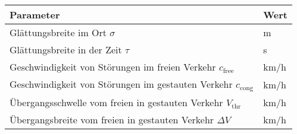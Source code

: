 \documentclass[portrait, a0, final]{a0poster}
\begin{document}
\sf
\normalsize
\begin{minipage}{35cm}
\textcolor{webfontcolor}{
\begin{tabular}{ll}
\toprule Parameter & Wert\\ 
\midrule 
Gl\"attungsbreite im Ort $\sigma$ & \unit[600]{m}\\ 
Gl\"attungsbreite in der Zeit $\tau$  & \unit[40]{s} \\ 
Geschwindigkeit von St\"orungen im freien Verkehr $c_\text{free}$ & \unit[50]{km/h}\\
Geschwindigkeit von St\"orungen im gestauten Verkehr $c_\text{cong}$ & \unit[-15]{km/h}\\
\"Ubergangsschwelle vom freien in gestauten Verkehr $V_\text{thr}$ & \unit[58]{km/h}\\
\"Ubergangsbreite vom freien in gestauten Verkehr $\Delta V$ & \unit[5]{km/h}\\
\bottomrule
\end{tabular}
}
\end{minipage}
\end{document}
